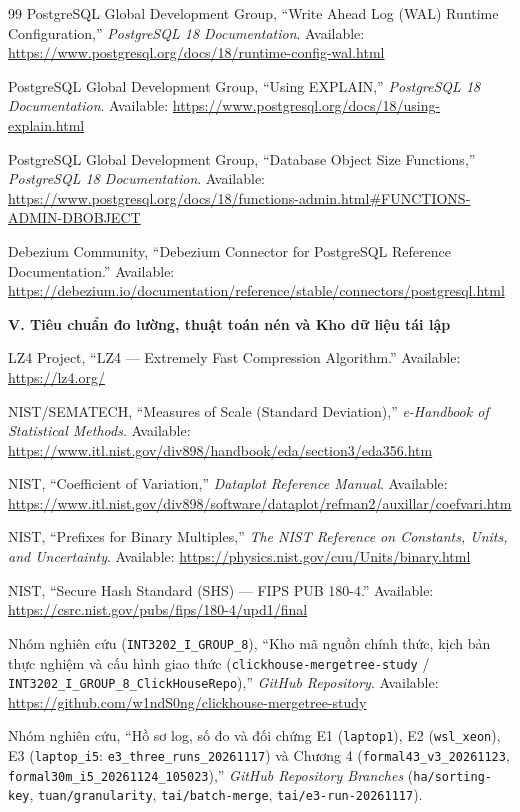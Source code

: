 \documentclass[13pt,a4paper]{report}
\begin{document}
\begin{thebibliography}{99}
 PostgreSQL Global Development Group, ``Write Ahead Log (WAL) Runtime Configuration,'' \textit{PostgreSQL 18 Documentation}. Available: \url{https://www.postgresql.org/docs/18/runtime-config-wal.html}

 PostgreSQL Global Development Group, ``Using EXPLAIN,'' \textit{PostgreSQL 18 Documentation}. Available: \url{https://www.postgresql.org/docs/18/using-explain.html}

 PostgreSQL Global Development Group, ``Database Object Size Functions,'' \textit{PostgreSQL 18 Documentation}. Available: \url{https://www.postgresql.org/docs/18/functions-admin.html#FUNCTIONS-ADMIN-DBOBJECT}

 Debezium Community, ``Debezium Connector for PostgreSQL Reference Documentation.'' Available: \url{https://debezium.io/documentation/reference/stable/connectors/postgresql.html}

\item[] \hspace{-\leftmargin}\textbf{V. Tiêu chuẩn đo lường, thuật toán nén và Kho dữ liệu tái lập}

 LZ4 Project, ``LZ4 --- Extremely Fast Compression Algorithm.'' Available: \url{https://lz4.org/}

 NIST/SEMATECH, ``Measures of Scale (Standard Deviation),'' \textit{e-Handbook of Statistical Methods}. Available: \url{https://www.itl.nist.gov/div898/handbook/eda/section3/eda356.htm}

 NIST, ``Coefficient of Variation,'' \textit{Dataplot Reference Manual}. Available: \url{https://www.itl.nist.gov/div898/software/dataplot/refman2/auxillar/coefvari.htm}

 NIST, ``Prefixes for Binary Multiples,'' \textit{The NIST Reference on Constants, Units, and Uncertainty}. Available: \url{https://physics.nist.gov/cuu/Units/binary.html}

 NIST, ``Secure Hash Standard (SHS) --- FIPS PUB 180-4.'' Available: \url{https://csrc.nist.gov/pubs/fips/180-4/upd1/final}

 Nhóm nghiên cứu (\texttt{INT3202\_I\_GROUP\_8}), ``Kho mã nguồn chính thức, kịch bản thực nghiệm và cấu hình giao thức (\texttt{clickhouse-mergetree-study} / \texttt{INT3202\_I\_GROUP\_8\_ClickHouseRepo}),'' \textit{GitHub Repository}. Available: \url{https://github.com/w1ndS0ng/clickhouse-mergetree-study}

 Nhóm nghiên cứu, ``Hồ sơ log, số đo và đối chứng E1 (\texttt{laptop1}), E2 (\texttt{wsl\_xeon}), E3 (\texttt{laptop\_i5}: \texttt{e3\_three\_runs\_20261117}) và Chương 4 (\texttt{formal43\_v3\_20261123}, \texttt{formal30m\_i5\_20261124\_105023}),'' \textit{GitHub Repository Branches} (\texttt{ha/sorting-key}, \texttt{tuan/granularity}, \texttt{tai/batch-merge}, \texttt{tai/e3-run-20261117}).

\end{thebibliography}
\end{document}
